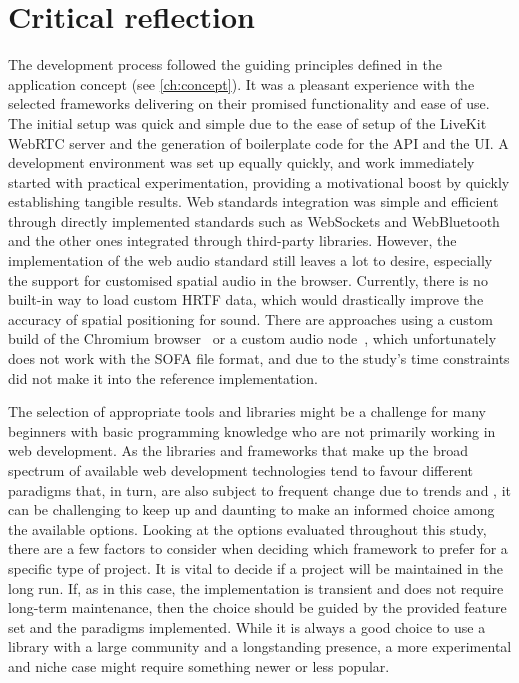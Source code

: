 \section{Critical reflection}
\label{sec:critical-reflection}

The development process followed the guiding principles defined in the application concept (see \autoref{ch:concept}).
It was a pleasant experience with the selected frameworks delivering on their promised functionality and ease of use.
The initial setup was quick and simple due to the ease of setup of the LiveKit \ac{WebRTC} server and the generation of boilerplate code for the \ac{API} and the \ac{UI}.
A development environment was set up equally quickly, and work immediately started with practical experimentation, providing a motivational boost by quickly establishing tangible results.
Web standards integration was simple and efficient through directly implemented standards such as WebSockets and WebBluetooth and the other ones integrated through third-party libraries.
However, the implementation of the web audio standard still leaves a lot to desire, especially the support for customised spatial audio in the browser.
Currently, there is no built-in way to load custom \ac{HRTF} data, which would drastically improve the accuracy of spatial positioning for sound.
There are approaches using a custom build of the Chromium browser~\parencite{chromiumCustomHrtf} or a custom audio node~\parencite{customHrtfAudioNode}, which unfortunately does not work with the \ac{SOFA} file format, and due to the study's time constraints did not make it into the reference implementation.

The selection of appropriate tools and libraries might be a challenge for many beginners with basic programming knowledge who are not primarily working in web development.
As the libraries and frameworks that make up the broad spectrum of available web development technologies tend to favour different paradigms that, in turn, are also subject to frequent change due to trends and , it can be challenging to keep up and daunting to make an informed choice among the available options.
Looking at the options evaluated throughout this study, there are a few factors to consider when deciding which framework to prefer for a specific type of project.
It is vital to decide if a project will be maintained in the long run.
If, as in this case, the implementation is transient and does not require long-term maintenance, then the choice should be guided by the provided feature set and the paradigms implemented.
While it is always a good choice to use a library with a large community and a longstanding presence, a more experimental and niche case might require something newer or less popular.

